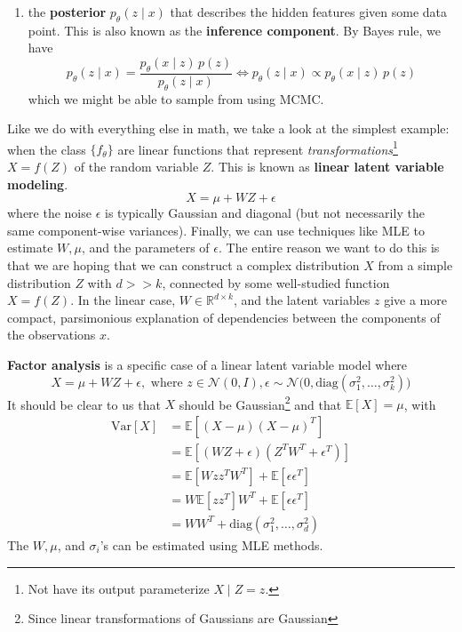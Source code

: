 \documentclass{article}
\begin{document}
\begin{definition}
\begin{enumerate}
      \item the \textbf{posterior} $p_\theta (z \mid x)$ that describes the hidden features given some data point. This is also known as the \textbf{inference component}. By Bayes rule, we have 
      \begin{equation}
        p_\theta (z \mid x) = \frac{p_\theta (x \mid z) \, p(z)}{p_\theta (z \mid x)} \iff p_\theta (z \mid x) \propto p_\theta (x \mid z) \, p(z)
      \end{equation}
      which we might be able to sample from using MCMC. 
    \end{enumerate}
  \end{definition} 

  Like we do with everything else in math, we take a look at the simplest example: when the class $\{f_\theta\}$ are linear functions that represent \textit{transformations}\footnote{Not have its output parameterize $X \mid Z = z$.} $X = f(Z)$ of the random variable $Z$. This is known as \textbf{linear latent variable modeling}. 
  \begin{equation}
    X = \mu + W Z + \epsilon
  \end{equation}
  where the noise $\epsilon$ is typically Gaussian and diagonal (but not necessarily the same component-wise variances). Finally, we can use techniques like MLE to estimate $W, \mu$, and the parameters of $\epsilon$. The entire reason we want to do this is that we are hoping that we can construct a complex distribution $X$ from a simple distribution $Z$ with $d >> k$, connected by some well-studied function $X = f(Z)$. In the linear case, $W \in \mathbb{R}^{d \times k}$, and the latent variables $z$ give a more compact, parsimonious  explanation of dependencies between the components of the observations $x$. 

  \begin{definition} 
    \textbf{Factor analysis} is a specific case of a linear latent variable model where 
    \begin{equation}
      X = \mu + WZ + \epsilon, \text{ where } z \in \mathcal{N}(0, I), \epsilon \sim \mathcal{N} \big(0, \mathrm{diag}(\sigma_1^2, \ldots, \sigma_k^2) \big)
    \end{equation}
    It should be clear to us that $X$ should be Gaussian\footnote{Since linear transformations of Gaussians are Gaussian} and that $\mathbb{E}[X] = \mu$, with 
    \begin{align} 
        \mathrm{Var}[X] & = \mathbb{E}[ (X - \mu)(X - \mu)^T ] \\
                        & = \mathbb{E}[ (W Z + \epsilon) (Z^T W^T + \epsilon^T)] \\
                        & = \mathbb{E}[W z z^T W^T] + \mathbb{E}[ \epsilon \epsilon^T] \\
                        & = W \mathbb{E}[ z z^T] W^T + \mathbb{E}[ \epsilon \epsilon^T] \\
                        & = W W^T + \mathrm{diag}(\sigma_1^2, \ldots, \sigma_d^2) 
    \end{align} 
    The $W, \mu$, and $\sigma_i$'s can be estimated using MLE methods. 
  \end{definition} 
\end{document}

